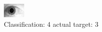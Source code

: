 \begin{figure}[h!]
\begin{center}
\includegraphics[width=0.60\columnwidth]{figures/ID1839_class_4_target_3.png}
\end{center}
\caption{ Classification: 4 actual target: 3}
\label{fig:ID1839_class_4_target_3}
\end{figure}
